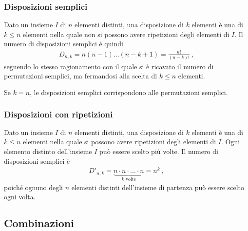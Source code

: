 \documentclass[letterpaper,10pt,italian]{jupyterBook}
\begin{document}
\subsubsection{Disposizioni semplici}
\label{\detokenize{ch/statistics/combinatorics:disposizioni-semplici}}
\sphinxAtStartPar
Dato un insieme \(I\) di \(n\) elementi distinti, una disposizione di \(k\) elementi è una  di \(k \le n\) elementi nella quale non si possono avere ripetizioni degli elementi di \(I\). Il numero di disposizioni semplici è quindi
\begin{equation*}
\begin{split}D_{n,k} = n (n-1) \dots (n-k+1) = \frac{n!}{(n-k)!} \ ,\end{split}
\end{equation*}
\sphinxAtStartPar
seguendo lo stesso ragionamento con il quale si è ricavato il numero di permutazioni semplici, ma fermandosi alla scelta di \(k \le n\) elementi.

\sphinxAtStartPar
{} Se \(k = n\), le disposizioni semplici corrispondono alle permutazioni semplici.


\subsubsection{Disposizioni con ripetizioni}
\label{\detokenize{ch/statistics/combinatorics:disposizioni-con-ripetizioni}}
\sphinxAtStartPar
Dato un insieme \(I\) di \(n\) elementi distinti, una disposizione di \(k\) elementi è una  di \(k \le n\) elementi nella quale si possono avere ripetizioni degli elementi di \(I\). Ogni elemento distinto dell’insieme \(I\) può essere scelto più volte. Il numero di disposizioni semplici è
\begin{equation*}
\begin{split}D'_{n,k} = \underbrace{n \cdot n \cdot \dots \cdot n}_{\text{$k $ volte}} = n^k \ ,\end{split}
\end{equation*}
\sphinxAtStartPar
poiché ognuno degli \(n\) elementi distinti dell’insieme di partenza può essere scelto ogni volta.


\subsection{Combinazioni}
\label{\detokenize{ch/statistics/combinatorics:combinazioni}}
\end{document}
